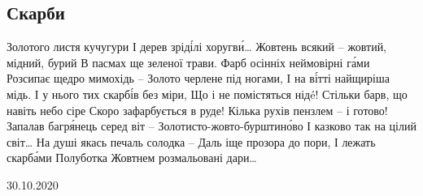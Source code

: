  
 
 

\subsection{Скарби}

Золотого листя кучугури
І дерев зріді́лі хоругви́…
Жовтень всякий – жовтий, мідний, бурий
В пасмах ще зеленої трави.
Фарб осінніх неймовірні га́ми
Розсипає щедро мимохідь –
Золото черлене під ногами,
І на ві́тті найщиріша мідь.
І у нього тих скарбі́в без міри,
Що і не помістяться нідé!
Стільки барв, що навіть небо сіре
Скоро зафарбується в руде!
Кілька рухів пензлем – і готово!
Запалав багря́нець серед віт –
Золотисто-жовто-бурштино́во
І казково так на цілий світ…
На душі якась печаль солодка –
Даль іще прозора до пори,
І лежать скарба́ми Полуботка
Жовтнем розмальовані дари…

30.10.2020
